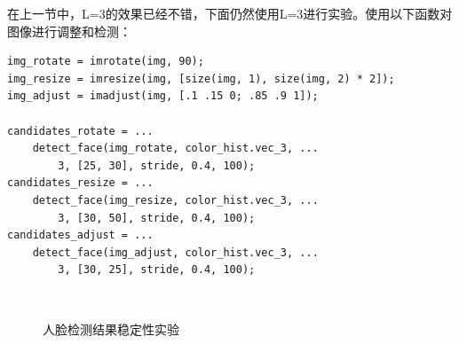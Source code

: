 \documentclass[10pt, a4paper]{article}
\begin{document}
在上一节中，L=3的效果已经不错，下面仍然使用L=3进行实验。使用以下函数对图像进行调整和检测：

\begin{verbatim}
img_rotate = imrotate(img, 90);
img_resize = imresize(img, [size(img, 1), size(img, 2) * 2]);
img_adjust = imadjust(img, [.1 .15 0; .85 .9 1]);

candidates_rotate = ...
    detect_face(img_rotate, color_hist.vec_3, ...
        3, [25, 30], stride, 0.4, 100);
candidates_resize = ...
    detect_face(img_resize, color_hist.vec_3, ...
        3, [30, 50], stride, 0.4, 100);
candidates_adjust = ...
    detect_face(img_adjust, color_hist.vec_3, ...
        3, [30, 25], stride, 0.4, 100);
\end{verbatim}

\begin{figure}[ht!]
    \centering
    \\
    \quad
    \caption{人脸检测结果稳定性实验}
    \label{fig:exp4_3}
\end{figure}
\end{document}
